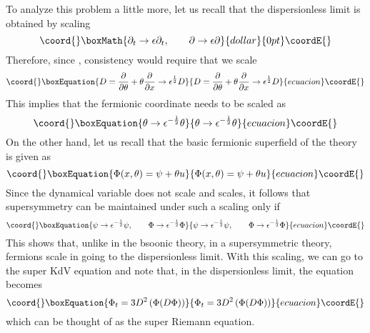\documentclass[a4paper,11pt]{article}
\begin{document}
To analyze this problem a little more, let us recall that the
dispersionless limit is obtained by scaling
$$\coord{}\boxMath{
\partial_{t}\rightarrow \epsilon \partial_{t},\qquad \partial
\rightarrow \epsilon \partial
}{dollar}{0pt}\coordE{}$$
Therefore, since \coordHE{}, consistency would require that we
scale
\begin{equation}\coord{}\boxEquation{
D = {\partial\over \partial \theta} + \theta {\partial\over \partial
x}  \rightarrow \epsilon^{1\over 2} D
}{
D = {\partial\over \partial \theta} + \theta {\partial\over \partial
x}  \rightarrow \epsilon^{1\over 2} D
}{ecuacion}\coordE{}\end{equation}
This implies that the fermionic coordinate needs to be scaled as
\begin{equation}\coord{}\boxEquation{
\theta \rightarrow \epsilon^{-{1\over 2}} \theta
}{
\theta \rightarrow \epsilon^{-{1\over 2}} \theta
}{ecuacion}\coordE{}\end{equation}
On the other hand, let us recall that the basic fermionic superfield
of the theory is given as
\begin{equation}\coord{}\boxEquation{
\Phi (x,\theta) = \psi + \theta u
}{
\Phi (x,\theta) = \psi + \theta u
}{ecuacion}\coordE{}\end{equation}
Since the dynamical variable \coordHE{} does not scale and \myHighlight{$\theta$}\coordHE{} scales,
it follows that supersymmetry can be maintained under such a scaling
only if
\begin{equation}\coord{}\boxEquation{
\psi \rightarrow \epsilon^{-{1\over 2}} \psi, \qquad \Phi\rightarrow
\epsilon^{-{1\over 2}} \Phi
}{
\psi \rightarrow \epsilon^{-{1\over 2}} \psi, \qquad \Phi\rightarrow
\epsilon^{-{1\over 2}} \Phi
}{ecuacion}\coordE{}\end{equation}
This shows that, unlike in the bsoonic theory, in a supersymmetric
theory, fermions scale in going to the dispersionless limit. With this
scaling, we can go to the super KdV equation and note that, in the
dispersionless limit, the equation becomes
\begin{equation}\coord{}\boxEquation{
\Phi_{t} = 3 D^{2} \left(\Phi (D\Phi)\right)
}{
\Phi_{t} = 3 D^{2} \left(\Phi (D\Phi)\right)
}{ecuacion}\coordE{}\end{equation}
which can be thought of as the super Riemann equation.
\end{document}
